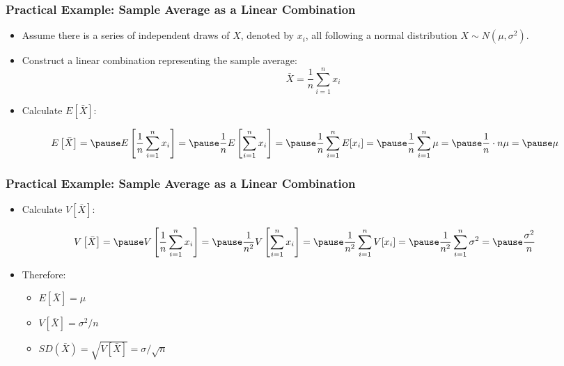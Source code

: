 \documentclass[handout]{beamer} %
\begin{document}
\begin{frame} %
\frametitle{Practical Example: Sample Average as a Linear Combination}

\begin{itemize}
    \item Assume there is a series of independent draws of $X$, denoted by $x_i$, all following a normal distribution $X \sim N(\mu, \sigma^2)$.
  \pause
    \item Construct a linear combination representing the sample average:
    \[
    \bar{X} = \frac{1}{n} \sum_{i=1}^n x_i
    \]
  \pause
    \item Calculate $E[\bar{X}]$:
  \pause
\end{itemize}
\begin{adjustwidth}{-0.5cm}{0cm}
    \[
    E\left[\bar{X}\right] =
  \pause E\left[\frac{1}{n} \sum_{i=1}^n x_i\right] =
  \pause \frac{1}{n} E\left[\sum_{i=1}^n x_i \right] =
  \pause \frac{1}{n} \sum_{i=1}^n E[x_i] =
  \pause \frac{1}{n} \sum_{i=1}^n \mu =
  \pause \frac{1}{n} \cdot n \mu =
  \pause \mu
    \]
\end{adjustwidth}


\end{frame}

\begin{frame} %
\frametitle{Practical Example: Sample Average as a Linear Combination}
\begin{itemize}
    \item Calculate $V[\bar{X}]$:
\end{itemize}
  \pause
\begin{adjustwidth}{-0.5cm}{0cm}
 $$V\left[\bar{X}\right] =
    \pause V\left[\frac{1}{n} \sum_{i=1}^n x_i\right] =
    \pause \frac{1}{n^2} V\left[ \sum_{i=1}^n x_i \right] =
    \pause \frac{1}{n^2} \sum_{i=1}^n V[x_i] =
    \pause \frac{1}{n^2} \sum_{i=1}^n \sigma^2 =
    \pause \frac{\sigma^2}{n} $$
\end{adjustwidth}  

\begin{itemize}
    \item Therefore:\pause
    
    \begin{itemize}
        \item $E[\bar{X}] = \mu$ \pause
        \item $V[\bar{X}] = \sigma^2 / n$\pause
        \item $SD(\bar{X}) = \sqrt{V[\bar{X}]}  = \sigma / \sqrt{n}$
    \end{itemize}
\end{itemize}

\end{frame}
\end{document}
